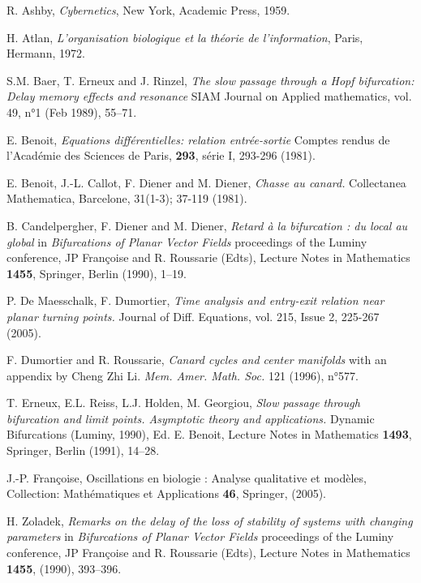 \documentclass[12pt,psamsfonts]{amsart}
\begin{document}
\begin{thebibliography}{99}

 R. Ashby,
{\it Cybernetics}, New York, Academic Press, 1959.

 H. Atlan,
{\it L'organisation biologique et la th\'eorie de l'information},
Paris, Hermann, 1972.

 S.M. Baer, T. Erneux and J. Rinzel,
{\it The slow passage through a Hopf bifurcation: Delay memory
effects and resonance} SIAM Journal on Applied mathematics, vol.
49, n°1 (Feb 1989), 55--71.

 E. Benoit,
{\it Equations diff\'erentielles: relation entr\'ee-sortie}
Comptes rendus de l'Acad\'emie des Sciences de Paris, {\bf 293},
s\'erie I, 293-296 (1981).

 E. Benoit, J.-L. Callot, F. Diener and M. Diener,
{\it Chasse au canard.} Collectanea Mathematica, Barcelone,
31(1-3); 37-119 (1981).

 B. Candelpergher, F. Diener and M. Diener,
{\it Retard \`a la bifurcation : du local au global} in {\it
Bifurcations of Planar Vector Fields} proceedings of the Luminy
conference, JP Fran\c{c}oise and R. Roussarie (Edts), Lecture
Notes in Mathematics {\bf 1455}, Springer, Berlin (1990), 1--19.

 P. De Maesschalk, F. Dumortier,
{\it Time analysis and entry-exit relation near planar turning
points.} Journal of Diff. Equations, vol. 215, Issue 2, 225-267
(2005).

 F. Dumortier and R. Roussarie,
{\it Canard cycles and center manifolds} with an appendix by Cheng
Zhi Li. {\it Mem. Amer. Math. Soc.} 121 (1996), n°577.

 T. Erneux, E.L. Reiss, L.J. Holden, M. Georgiou,
{\it Slow passage through bifurcation and limit points. Asymptotic
theory and applications.} Dynamic Bifurcations (Luminy, 1990), Ed.
E. Benoit, Lecture Notes in Mathematics {\bf 1493}, Springer, Berlin (1991),
14--28.

 J.-P. Fran\c{c}oise, Oscillations en
biologie : Analyse qualitative et mod{\`e}les, Collection: Math{\'e}matiques
et Applications {\bf 46}, Springer, (2005).

 H. Zoladek,
{\it Remarks on the delay of the loss of stability of systems with
changing parameters} in {\it
Bifurcations of Planar Vector Fields} proceedings of the Luminy
conference, JP Fran\c{c}oise and R. Roussarie (Edts), Lecture
Notes in Mathematics {\bf 1455}, (1990), 393--396.
\end{thebibliography}
\end{document}
